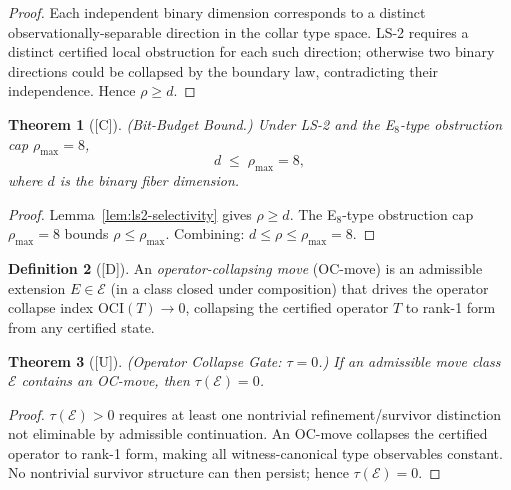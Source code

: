 \documentclass[12pt,oneside]{amsbook}
\theoremstyle{plain}
\newtheorem{theorem}{Theorem}[section]
\theoremstyle{definition}
\newtheorem{definition}[theorem]{Definition}
\theoremstyle{remark}
\newcommand{\status}[1]{\textup{[#1]}}
\begin{document}
\begin{proof}
Each independent binary dimension corresponds to a distinct
observationally-separable direction in the collar type space.  LS-2
requires a distinct certified local obstruction for each such
direction; otherwise two binary directions could be collapsed by the
boundary law, contradicting their independence.  Hence $\rho \geq d$.
\end{proof}

\clearpage
\begin{theorem}[\status{C}]\label{thm:bit-budget}
\textup{(Bit-Budget Bound.)}  Under LS-2 and the E${}_8$-type
obstruction cap $\rho_{\max} = 8$,
\[
  d \;\leq\; \rho_{\max} = 8,
\]
where $d$ is the binary fiber dimension.
\end{theorem}

\begin{proof}
Lemma~\ref{lem:ls2-selectivity} gives $\rho \geq d$.  The E${}_8$-type
obstruction cap $\rho_{\max} = 8$ bounds $\rho \leq \rho_{\max}$.
Combining: $d \leq \rho \leq \rho_{\max} = 8$.
\end{proof}


\begin{definition}[\status{D}]\label{def:OC-move}
An \emph{operator-collapsing move} (OC-move) is an admissible extension
$E \in \mathcal{E}$ (in a class closed under composition) that drives
the operator collapse index $\mathrm{OCI}(T) \to 0$, collapsing the
certified operator $T$ to rank-1 form from any certified state.
\end{definition}

\begin{theorem}[\status{U}]\label{thm:OC-gate}
\textup{(Operator Collapse Gate: $\tau = 0$.)}  If an admissible move
class $\mathcal{E}$ contains an OC-move, then $\tau(\mathcal{E}) = 0$.
\end{theorem}

\begin{proof}
$\tau(\mathcal{E}) > 0$ requires at least one nontrivial
refinement/survivor distinction not eliminable by admissible
continuation.  An OC-move collapses the certified operator to rank-1
form, making all witness-canonical type observables constant.  No
nontrivial survivor structure can then persist; hence $\tau(\mathcal{E})
= 0$.
\end{proof}
\end{document}
